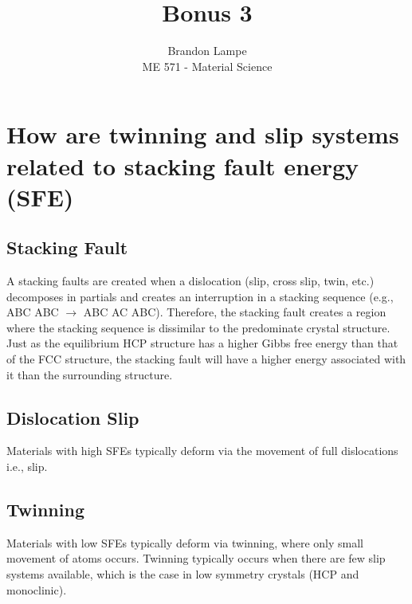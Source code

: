 \documentclass[10pt, letterpaper]{article}
\begin{document}
 
 
\title{Bonus 3}%
\author{Brandon Lampe\\ %
ME 571 - Material Science} %
 
\maketitle
 
\section{How are twinning and slip systems related to stacking fault energy (SFE)}

\subsection{Stacking Fault}
 A stacking faults are created when a dislocation (slip, cross slip, twin, etc.) decomposes in partials and creates an interruption in a stacking sequence (e.g., ABC ABC $\rightarrow$ ABC AC ABC).  Therefore, the stacking fault creates a region where the stacking sequence is dissimilar to the predominate crystal structure.  Just as the equilibrium HCP structure has a higher Gibbs free energy than that of the FCC structure, the stacking fault will have a higher energy associated with it than the surrounding structure.

\subsection{Dislocation Slip}
Materials with high SFEs typically deform via the movement of full dislocations i.e., slip.  

\subsection{Twinning}	 
Materials with low SFEs typically deform via twinning, where only small movement of atoms occurs.  Twinning typically occurs when there are few slip systems available, which is the case in low symmetry crystals (HCP and monoclinic). 
 
\end{document}

